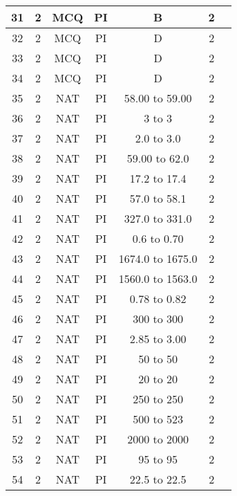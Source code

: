 \begin{table}[h]
\begin{center}
\begin{tabular}{|c|c|c|c|c|c|c|}
\hline
31 & 2 & MCQ & PI & B & 2 \\
\hline
32 & 2 & MCQ & PI & D & 2 \\
\hline
33 & 2 & MCQ & PI & D & 2 \\
\hline
34 & 2 & MCQ & PI & D & 2\\
\hline
35 & 2 & NAT & PI & 58.00 to 59.00  & 2\\
\hline
36 & 2 & NAT & PI & 3 to 3 & 2\\
\hline
37 & 2 & NAT & PI & 2.0 to 3.0 & 2 \\
\hline
38 & 2 & NAT & PI & 59.00 to 62.0 & 2\\
\hline
39 & 2 & NAT & PI & 17.2 to 17.4 & 2\\
\hline
40 & 2 & NAT & PI & 57.0 to 58.1 & 2 \\
\hline
41 & 2 & NAT & PI & 327.0 to 331.0 & 2 \\
\hline
42 & 2 & NAT & PI & 0.6 to 0.70 & 2 \\
\hline
43 & 2 & NAT & PI & 1674.0 to 1675.0 & 2 \\
\hline
44 & 2 & NAT & PI & 1560.0 to 1563.0 & 2\\
\hline
45 & 2 & NAT & PI & 0.78 to 0.82 & 2 \\
\hline
46 & 2 & NAT & PI & 300 to 300 & 2 \\
\hline
47 & 2 & NAT & PI & 2.85 to 3.00 & 2 \\
\hline
48 & 2 & NAT & PI & 50 to 50 & 2 \\
\hline
49 & 2 & NAT & PI & 20 to 20 & 2 \\
\hline
50 & 2 & NAT & PI & 250 to 250 & 2 \\
\hline
51 & 2 & NAT & PI & 500 to 523 & 2 \\
\hline
52 & 2 & NAT & PI & 2000 to 2000 & 2\\
\hline
53 & 2 & NAT & PI & 95 to 95 & 2\\
\hline
54 & 2 & NAT & PI & 22.5 to 22.5 & 2 \\
\hline
\end{tabular}
\end{center}
\end{table}